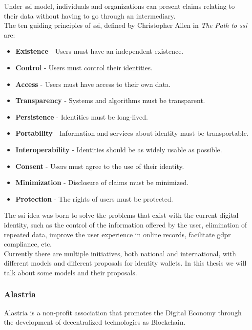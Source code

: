 \documentclass[a4paper, 12pt]{article} %
\begin{document}
            Under \acrlong{ssi} model, individuals and organizations can present claims relating to their data without having to go through an intermediary.\\
            
            The ten guiding principles of \acrshort{ssi}, defined by Christopher Allen in \textit{The Path to \acrlong{ssi}}\cite{path-to-ssi} are:\\
            \begin{itemize}
                \item \textbf{Existence} - Users must have an independent existence.
                \item \textbf{Control} - Users must control their identities.
                \item \textbf{Access} - Users must have access to their own data.
                \item \textbf{Transparency} - Systems and algorithms must be transparent.
                \item \textbf{Persistence} - Identities must be long-lived.
                \item \textbf{Portability} - Information and services about identity must be transportable.
                \item \textbf{Interoperability} - Identities should be as widely usable as possible.
                \item \textbf{Consent} - Users must agree to the use of their identity.
                \item \textbf{Minimization} - Disclosure of claims must be minimized.
                \item \textbf{Protection} - The rights of users must be protected.
            \end{itemize}
            
            The \acrshort{ssi} idea was born to solve the problems that exist with the current digital identity, such as the control of the information offered by the user, elimination of repeated data, improve the user experience in online records, facilitate \acrshort{gdpr} compliance, etc.\\
            
            Currently there are multiple initiatives, both national and international, with different models and different proposals for identity wallets. In this thesis we will talk about some models and their proposals.
            
        \subsubsection{Alastria}
            Alastria is a non-profit association that promotes the Digital Economy through the development of decentralized technologies as Blockchain.\\
            
\end{document}
